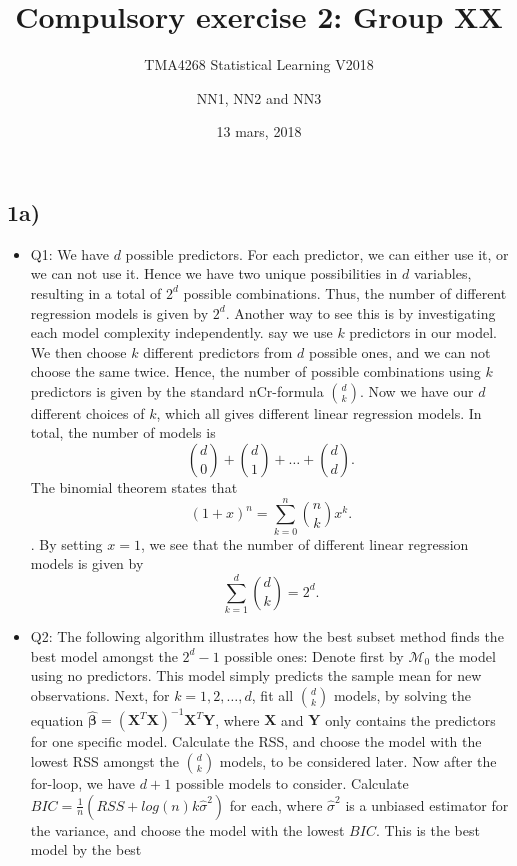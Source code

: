 \documentclass[]{article}
\title{Compulsory exercise 2: Group XX}
\subtitle{TMA4268 Statistical Learning V2018}
\author{NN1, NN2 and NN3}
\date{13 mars, 2018}
\providecommand{\tightlist}{%
  \setlength{\itemsep}{0pt}\setlength{\parskip}{0pt}}
\begin{document}
\maketitle

\subsection{1a)}\label{a}

\begin{itemize}
\tightlist
\item
  Q1: We have \(d\) possible predictors. For each predictor, we can
  either use it, or we can not use it. Hence we have two unique
  possibilities in \(d\) variables, resulting in a total of \(2^d\)
  possible combinations. Thus, the number of different regression models
  is given by \(2^d\). Another way to see this is by investigating each
  model complexity independently. say we use \(k\) predictors in our
  model. We then choose \(k\) different predictors from \(d\) possible
  ones, and we can not choose the same twice. Hence, the number of
  possible combinations using \(k\) predictors is given by the standard
  nCr-formula \(\binom{d}{k}\). Now we have our \(d\) different choices
  of \(k\), which all gives different linear regression models. In
  total, the number of models is
  \[\binom{d}{0}+\binom{d}{1}+\dots+\binom{d}{d}.\] The binomial theorem
  states that \[(1+x)^n=\sum_{k=0}^n \binom{n}{k} x^k.\]. By setting
  \(x=1\), we see that the number of different linear regression models
  is given by \[\sum_{k=1}^d \binom{d}{k}=2^d.\]
\item
  Q2: The following algorithm illustrates how the best subset method
  finds the best model amongst the \(2^d-1\) possible ones: Denote first
  by \(\mathcal{M}_0\) the model using no predictors. This model simply
  predicts the sample mean for new observations. Next, for
  \(k=1,2,\dots,d\), fit all \(\binom{d}{k}\) models, by solving the
  equation
  \(\hat{\boldsymbol \beta} =(\boldsymbol X^T \boldsymbol X)^{-1} \boldsymbol X^T \boldsymbol Y\),
  where \(\boldsymbol{X}\) and \(\boldsymbol{Y}\) only contains the
  predictors for one specific model. Calculate the RSS, and choose the
  model with the lowest RSS amongst the \(\binom{d}{k}\) models, to be
  considered later. Now after the for-loop, we have \(d+1\) possible
  models to consider. Calculate
  \(BIC=\frac{1}{n}(RSS+log(n)k\hat \sigma^2)\) for each, where
  \(\hat \sigma^2\) is a unbiased estimator for the variance, and choose
  the model with the lowest \(BIC\). This is the best model by the best

\end{itemize}
\end{document}
